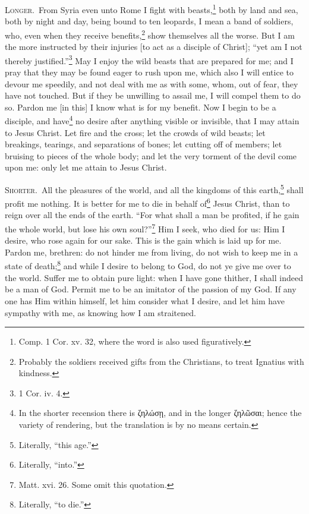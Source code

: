 \textsc{Longer.}~From Syria even unto Rome I fight with beasts,\footnote{Comp. 1 Cor. xv. 32, where the word is also used figuratively.} both by land and sea, both by night and day, being bound to ten leopards, I mean a band of soldiers, who, even when they receive benefits,\footnote{Probably the soldiers received gifts from the Christians, to treat Ignatius with kindness.} show themselves all the worse. But I am the more instructed by their injuries [to act as a disciple of Christ]; “yet am I not thereby justified.”\footnote{1 Cor. iv. 4.} May I enjoy the wild beasts that are prepared for me; and I pray that they may be found eager to rush upon me, which also I will entice to devour me speedily, and not deal with me as with some, whom, out of fear, they have not touched. But if they be unwilling to assail me, I will compel them to do so. Pardon me [in this] I know what is for my benefit. Now I begin to be a disciple, and have\footnote{In the shorter recension there is \textgreek{ζηλώσῃ}, and in the longer \textgreek{ζηλῶσαι}; hence the variety of rendering, but the translation is by no means certain.} no desire after anything visible or invisible, that I may attain to Jesus Christ. Let fire and the cross; let the crowds of wild beasts; let breakings, tearings, and separations of bones; let cutting off of members; let bruising to pieces of the whole body; and let the very torment of the devil come upon me: only let me attain to Jesus Christ.


\textsc{Shorter.}~All the pleasures of the world, and all the kingdoms of this earth,\footnote{Literally, “this age.”} shall profit me nothing. It is better for me to die in behalf of\footnote{Literally, “into.”} Jesus Christ, than to reign over all the ends of the earth. “For what shall a man be profited, if he gain the whole world, but lose his own soul?”\footnote{Matt. xvi. 26. Some omit this quotation.} Him I seek, who died for us: Him I desire, who rose again for our sake. This is the gain which is laid up for me. Pardon me, brethren: do not hinder me from living, do not wish to keep me in a state of death;\footnote{Literally, “to die.”} and while I desire to belong to God, do not ye give me over to the world. Suffer me to obtain pure light: when I have gone thither, I shall indeed be a man of God. Permit me to be an imitator of the passion of my God. If any one has Him within himself, let him consider what I desire, and let him have sympathy with me, as knowing how I am straitened.

